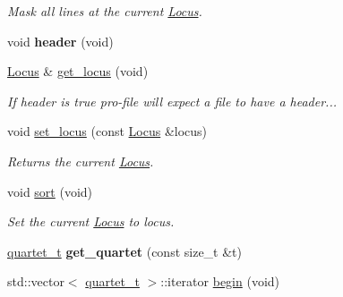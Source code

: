 \begin{DoxyCompactItemize}
\begin{DoxyCompactList}\small\item\em Mask all lines at the current \hyperlink{classLocus}{Locus}. \end{DoxyCompactList}\item 
\hypertarget{classprofile_a892bf141289ed3c79ad5cab0a2b3dab7}{void {\bfseries header} (void)}\label{classprofile_a892bf141289ed3c79ad5cab0a2b3dab7}

\item 
\hypertarget{classprofile_ae492f3ad1b510800f48b5f5b3193727c}{\hyperlink{classLocus}{Locus} \& \hyperlink{classprofile_ae492f3ad1b510800f48b5f5b3193727c}{get\-\_\-locus} (void)}\label{classprofile_ae492f3ad1b510800f48b5f5b3193727c}

\begin{DoxyCompactList}\small\item\em If header is true pro-\/file will expect a file to have a header... \end{DoxyCompactList}\item 
\hypertarget{classprofile_a5366b21183f3d044ead3b2e33c7f2945}{void \hyperlink{classprofile_a5366b21183f3d044ead3b2e33c7f2945}{set\-\_\-locus} (const \hyperlink{classLocus}{Locus} \&locus)}\label{classprofile_a5366b21183f3d044ead3b2e33c7f2945}

\begin{DoxyCompactList}\small\item\em Returns the current \hyperlink{classLocus}{Locus}. \end{DoxyCompactList}\item 
void \hyperlink{classprofile_acedf2b55cee28e81c3c44d41ecb51eca}{sort} (void)
\begin{DoxyCompactList}\small\item\em Set the current \hyperlink{classLocus}{Locus} to locus. \end{DoxyCompactList}\item 
\hypertarget{classprofile_aac89e606f53ad0187406dbb71271813d}{\hyperlink{structquartet}{quartet\-\_\-t} {\bfseries get\-\_\-quartet} (const size\-\_\-t \&t)}\label{classprofile_aac89e606f53ad0187406dbb71271813d}

\item 
\hypertarget{classprofile_a075e3dfdf9550243f974bdf296b84c81}{std\-::vector$<$ \hyperlink{structquartet}{quartet\-\_\-t} $>$\-::iterator \hyperlink{classprofile_a075e3dfdf9550243f974bdf296b84c81}{begin} (void)}\label{classprofile_a075e3dfdf9550243f974bdf296b84c81}


\end{DoxyCompactItemize}
